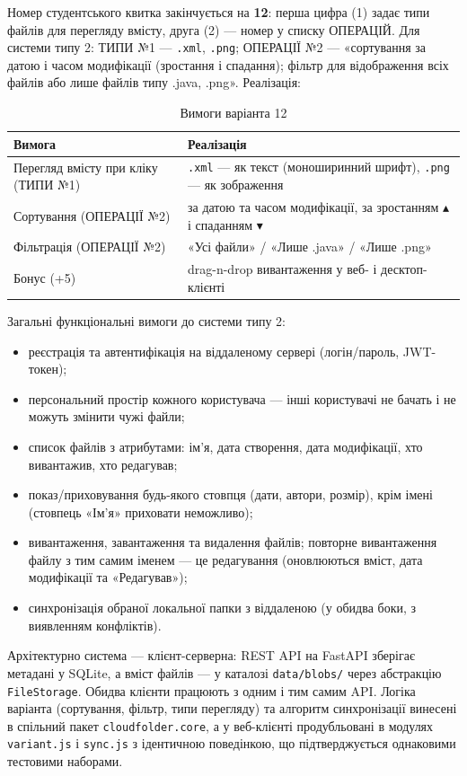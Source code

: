 \documentclass[12pt,a4paper]{article}
\begin{document}
Номер студентського квитка закінчується на \textbf{12}: перша цифра (1) задає типи файлів для перегляду вмісту, друга (2) --- номер у списку ОПЕРАЦІЙ. Для системи типу 2: ТИПИ №1 --- \texttt{.xml}, \texttt{.png}; ОПЕРАЦІЇ №2 --- «сортування за датою і часом модифікації (зростання і спадання); фільтр для відображення всіх файлів або лише файлів типу .java, .png». Реалізація:

{\small
\begin{longtable}{@{}p{5cm}p{11cm}@{}}
\caption{Вимоги варіанта 12}\\
\toprule
\textbf{Вимога} & \textbf{Реалізація} \\
\midrule
\endhead
Перегляд вмісту при кліку (ТИПИ №1) & \texttt{.xml} --- як текст (моноширинний шрифт), \texttt{.png} --- як зображення \\ \midrule
Сортування (ОПЕРАЦІЇ №2) & за датою та часом модифікації, за зростанням $\blacktriangle$ і спаданням $\blacktriangledown$ \\ \midrule
Фільтрація (ОПЕРАЦІЇ №2) & «Усі файли» / «Лише .java» / «Лише .png» \\ \midrule
Бонус (+5) & drag-n-drop вивантаження у веб- і десктоп-клієнті \\ \midrule
\bottomrule
\end{longtable}}

Загальні функціональні вимоги до системи типу 2:

\begin{itemize}[nosep]
    \item реєстрація та автентифікація на віддаленому сервері (логін/пароль, JWT-токен);
    \item персональний простір кожного користувача --- інші користувачі не бачать і не можуть змінити чужі файли;
    \item список файлів з атрибутами: ім'я, дата створення, дата модифікації, хто вивантажив, хто редагував;
    \item показ/приховування будь-якого стовпця (дати, автори, розмір), крім імені (стовпець «Ім'я» приховати неможливо);
    \item вивантаження, завантаження та видалення файлів; повторне вивантаження файлу з тим самим іменем --- це редагування (оновлюються вміст, дата модифікації та «Редагував»);
    \item синхронізація обраної локальної папки з віддаленою (у обидва боки, з виявленням конфліктів).
\end{itemize}

Архітектурно система --- клієнт-серверна: REST API на FastAPI зберігає метадані у SQLite, а вміст файлів --- у каталозі \texttt{data/\allowbreak{}blobs/\allowbreak{}} через абстракцію \texttt{FileStorage}. Обидва клієнти працюють з одним і тим самим API. Логіка варіанта (сортування, фільтр, типи перегляду) та алгоритм синхронізації винесені в спільний пакет \texttt{cloudfolder.core}, а у веб-клієнті продубльовані в модулях \texttt{variant.js} і \texttt{sync.js} з ідентичною поведінкою, що підтверджується однаковими тестовими наборами.
\end{document}
